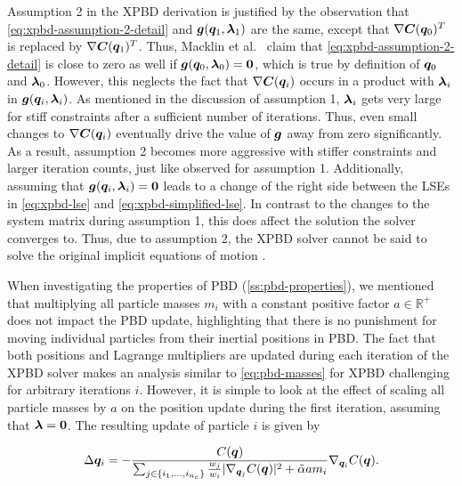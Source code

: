 Assumption 2 in the XPBD derivation is justified by the observation that \autoref{eq:xpbd-assumption-2-detail} and $\bm{g}(\bm{q}_1, 
\bm{\lambda}_1)$ are the same, except that $\nabla \bm{C}(\bm{q}_0)^T$ is replaced by $\nabla \bm{C}(\bm{q}_1)^T$. Thus, Macklin et al.\ 
\cite{macklin2016} claim that \autoref{eq:xpbd-assumption-2-detail} is close to zero as well if $\bm{g}(\bm{q}_0, \bm{\lambda}_0) = \bm{0}$, 
which is true by definition of $\bm{q}_0$ and $\bm{\lambda}_0$. However, this neglects the fact that $\nabla \bm{C}(\bm{q}_i)$ occurs in 
a product with $\bm{\lambda}_i$ in $\bm{g}(\bm{q}_i, \bm{\lambda}_i)$. As mentioned in the discussion of assumption 1, 
$\bm{\lambda}_i$ gets very large for stiff constraints after a 
sufficient number of iterations. Thus, even small changes to $\nabla \bm{C}(\bm{q}_i)$ eventually drive the value of $\bm{g}$ away from zero
significantly. As a result, assumption 2 becomes more aggressive with stiffer constraints and larger iteration counts, just like observed
for assumption 1. Additionally, assuming that $\bm{g}(\bm{q}_i, \bm{\lambda}_i) = \bm{0}$ leads to a change of the right side between 
the LSEs in \autoref{eq:xpbd-lse} and \autoref{eq:xpbd-simplified-lse}. In contrast to the changes to the system matrix during assumption 1, 
this does affect the solution the solver converges to. Thus, due to assumption 2, the XPBD solver cannot be said to solve the original 
implicit equations of motion \cite{macklin2016}.

When investigating the properties of PBD (\cref{ss:pbd-properties}), we mentioned that multiplying all particle masses $m_i$ with a constant
positive factor $a \in \mathbb{R}^+$ does not impact the PBD update, highlighting that there is no punishment for moving individual
particles from their inertial positions in PBD. The fact that both positions and Lagrange multipliers are updated during each
iteration of the XPBD solver makes an analysis similar to \autoref{eq:pbd-masses} for XPBD challenging for arbitrary iterations $i$. However, it 
is simple to look at the effect of scaling all particle masses by $a$ on the position update during the first iteration, assuming that 
$\bm{\lambda} = \bm{0}$. The resulting update of particle $i$ is given by

\begin{equation}\label{eq:xpbd-masses}
    \Delta \bm{q}_i 
    = -\frac{C(\bm{q})}{\sum_{j \in \{ i_1, \ldots, i_{n_c} \}} \frac{w_j}{w_i} \vert \nabla_{\bm{q}_j}C(\bm{q}) \vert^2 + \tilde{\alpha}a m_i} 
    \nabla_{\bm{q}_i} C(\bm{q}).
\end{equation}

